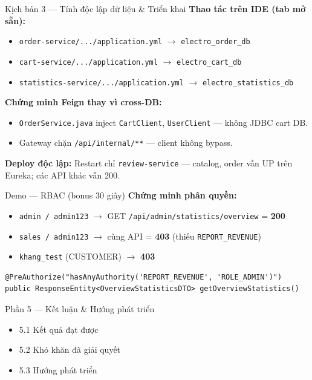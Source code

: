 \documentclass[aspectratio=169,12pt]{beamer}
\begin{document}
\begin{frame}{Kịch bản 3 — Tính độc lập dữ liệu \& Triển khai}
  \textbf{Thao tác trên IDE (tab mở sẵn):}
  \begin{itemize}
    \item \texttt{order-service/.../application.yml} $\rightarrow$ \texttt{electro\_order\_db}
    \item \texttt{cart-service/.../application.yml} $\rightarrow$ \texttt{electro\_cart\_db}
    \item \texttt{statistics-service/.../application.yml} $\rightarrow$ \texttt{electro\_statistics\_db}
  \end{itemize}

  \vspace{0.4em}
  \textbf{Chứng minh Feign thay vì cross-DB:}
  \begin{itemize}
    \item \texttt{OrderService.java} inject \texttt{CartClient}, \texttt{UserClient} — không JDBC cart DB.
    \item Gateway chặn \texttt{/api/internal/**} — client không bypass.
  \end{itemize}

  \vspace{0.4em}
  \textbf{Deploy độc lập:} Restart chỉ \texttt{review-service} — catalog, order vẫn UP trên Eureka; các API khác vẫn 200.
\end{frame}

\begin{frame}[fragile]{Demo — RBAC (bonus 30 giây)}
  \textbf{Chứng minh phân quyền:}
  \begin{itemize}
    \item \texttt{admin / admin123} $\rightarrow$ GET \texttt{/api/admin/statistics/overview} = \textbf{200}
    \item \texttt{sales / admin123} $\rightarrow$ cùng API = \textbf{403} (thiếu \texttt{REPORT\_REVENUE})
    \item \texttt{khang\_test} (CUSTOMER) $\rightarrow$ \textbf{403}
  \end{itemize}
  \vspace{0.3em}
  \begin{lstlisting}[caption={AdminStatisticsController.java}]
@PreAuthorize("hasAnyAuthority('REPORT_REVENUE', 'ROLE_ADMIN')")
public ResponseEntity<OverviewStatisticsDTO> getOverviewStatistics()
  \end{lstlisting}
\end{frame}

\begin{frame}{Phần 5 — Kết luận \& Hướng phát triển}
  \begin{itemize}
    \item 5.1 Kết quả đạt được
    \item 5.2 Khó khăn đã giải quyết
    \item 5.3 Hướng phát triển
  \end{itemize}
\end{frame}
\end{document}
